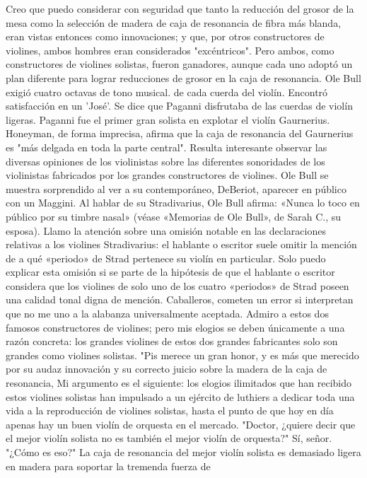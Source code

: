 Creo que puedo considerar con seguridad que tanto la reducción del grosor de la mesa como la selección de madera de caja de resonancia de fibra más blanda, eran vistas entonces como
innovaciones; y que, por otros constructores de violines, ambos hombres eran considerados "excéntricos". Pero ambos, como constructores de violines solistas, fueron ganadores, aunque cada uno adoptó un plan diferente para lograr reducciones de grosor en la caja de resonancia. Ole Bull exigió cuatro octavas de tono musical.
de cada cuerda del violín. Encontró satisfacción en un 'José'.
Se dice que Paganni disfrutaba de las cuerdas de violín ligeras. Paganni fue el primer gran solista en explotar el violín Gaurnerius. Honeyman, de forma imprecisa, afirma que la caja de resonancia del Gaurnerius es "más delgada en toda la parte central".
Resulta interesante observar las diversas opiniones de los violinistas sobre las diferentes sonoridades de los violinistas fabricados por los grandes constructores de violines.
Ole Bull se muestra sorprendido al ver a su contemporáneo, DeBeriot, aparecer en público con un Maggini.
Al hablar de su Stradivarius, Ole Bull afirma: «Nunca lo toco en público por su timbre nasal» (véase «Memorias de Ole Bull», de Sarah C., su esposa). Llamo la atención sobre una omisión notable en las declaraciones relativas a los violines Stradivarius: el hablante o escritor suele omitir la mención de a qué «periodo» de Strad pertenece su violín en particular. Solo puedo explicar esta omisión si se parte de la hipótesis de que el hablante o escritor considera que los violines de solo uno de los cuatro «periodos» de Strad poseen una calidad tonal digna de mención.
Caballeros, cometen un error si interpretan que no me uno a la alabanza universalmente aceptada. \label{mejor_violin`}
Admiro a estos dos famosos constructores de violines; pero mis elogios se deben únicamente a una razón concreta: los grandes violines de estos dos grandes fabricantes solo son grandes como violines solistas.
"Pis merece un gran honor, y es más que merecido por su audaz innovación y su correcto juicio sobre la madera de la caja de resonancia,
Mi argumento es el siguiente: los elogios ilimitados que han recibido estos violines solistas han impulsado a un ejército de luthiers a dedicar toda una vida a la reproducción de violines solistas, hasta el punto de que hoy en día apenas hay un buen violín de orquesta en el mercado.
"Doctor, ¿quiere decir que el mejor violín solista no es también el mejor violín de orquesta?" Sí, señor.
"¿Cómo es eso?"
La caja de resonancia del mejor violín solista es demasiado ligera en madera para soportar la tremenda fuerza de
